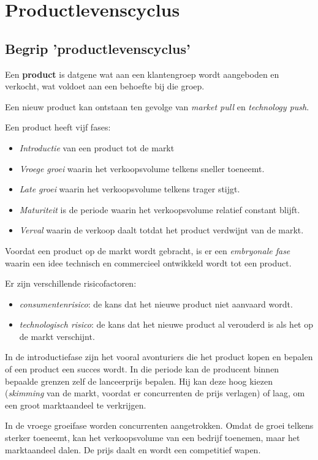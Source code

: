 \documentclass[../../samenvatting.tex]{subfiles}
\begin{document}
\section{Productlevenscyclus}
\subsection{Begrip 'productlevenscyclus'}
Een \textbf{product} is datgene wat aan een klantengroep wordt aangeboden en verkocht, wat voldoet aan een behoefte bij die groep.

Een nieuw product kan ontstaan ten gevolge van \emph{market pull} en \emph{technology push}.

Een product heeft vijf fases:
\begin{itemize}
    \item \emph{Introductie} van een product tot de markt
    \item \emph{Vroege groei} waarin het verkoopsvolume telkens sneller toeneemt.
    \item \emph{Late groei} waarin het verkoopsvolume telkens trager stijgt.
    \item \emph{Maturiteit} is de periode waarin het verkoopsvolume relatief constant blijft.
    \item \emph{Verval} waarin de verkoop daalt totdat het product verdwijnt van de markt.
\end{itemize}

Voordat een product op de markt wordt gebracht, is er een \emph{embryonale fase} waarin een idee technisch en commercieel ontwikkeld wordt tot een product.

Er zijn verschillende risicofactoren:
\begin{itemize}
    \item \emph{consumentenrisico}: de kans dat het nieuwe product niet aanvaard wordt.
    \item \emph{technologisch risico}: de kans dat het nieuwe product al verouderd is als het op de markt verschijnt.
\end{itemize}

In de introductiefase zijn het vooral avonturiers die het product kopen en bepalen of een product een succes wordt. In die periode kan de producent binnen bepaalde grenzen zelf de lanceerprijs bepalen. Hij kan deze hoog kiezen (\emph{skimming} van de markt, voordat er concurrenten de prijs verlagen) of laag, om een groot marktaandeel te verkrijgen.

In de vroege groeifase worden concurrenten aangetrokken. Omdat de groei telkens sterker toeneemt, kan het verkoopsvolume van een bedrijf toenemen, maar het marktaandeel dalen. De prijs daalt en wordt een competitief wapen.
\end{document}

